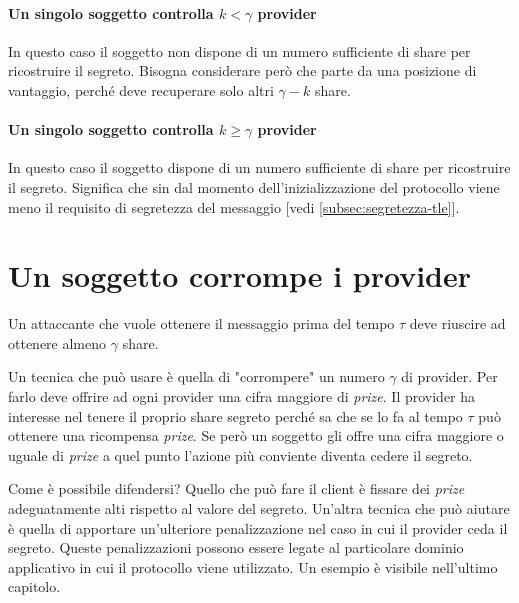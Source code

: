 \paragraph{Un singolo soggetto controlla $ k < \gamma $ provider}
In questo caso il soggetto non dispone di un numero sufficiente di share per
ricostruire il segreto. Bisogna considerare però che parte da una posizione di
vantaggio, perché deve recuperare solo altri $ \gamma - k $ share.
\paragraph{Un singolo soggetto controlla $ k \geq \gamma $ provider}
In questo caso il soggetto dispone di un numero sufficiente di share per
ricostruire il segreto. Significa che sin dal momento dell'inizializzazione
del protocollo viene meno il requisito di
segretezza del messaggio [vedi \ref{subsec:segretezza-tle}].


\section{Un soggetto corrompe i provider}
Un attaccante che vuole ottenere il messaggio prima del tempo $ \tau $ deve riuscire
ad ottenere almeno $ \gamma $ share.

Un tecnica che può usare è quella di "corrompere" un numero $ \gamma $ di provider.
Per farlo deve offrire ad ogni provider una cifra maggiore di \textit{prize}.
Il provider ha interesse nel tenere il proprio share segreto perché sa che se lo fa
al tempo $ \tau $ può ottenere una ricompensa \textit{prize}.
Se però un soggetto gli
offre una cifra maggiore o uguale di \textit{prize} a quel punto l'azione
più conviente diventa cedere il segreto.

Come è possibile difendersi? Quello che può fare il client è fissare dei
\textit{prize} adeguatamente alti rispetto al valore del segreto.
Un'altra tecnica che può aiutare è quella di
apportare un'ulteriore penalizzazione nel
caso in cui il provider ceda il segreto. Queste penalizzazioni possono essere
legate al particolare dominio applicativo in cui il protocollo viene utilizzato.
Un esempio è visibile nell'ultimo capitolo.